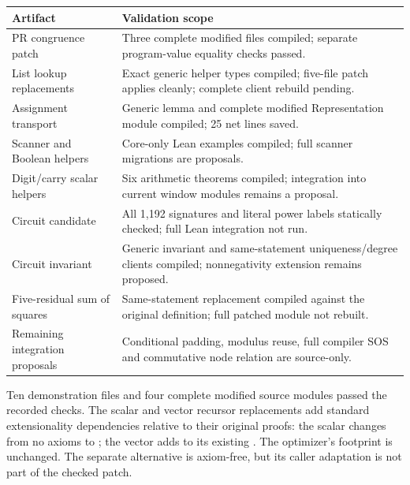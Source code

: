 \begin{center}
\small
\begin{tabularx}{\textwidth}{p{}Y}
\toprule
Artifact & Validation scope\\
\midrule
PR congruence patch & Three complete modified files compiled; separate program-value equality checks passed.\\
List lookup replacements & Exact generic helper types compiled; five-file patch applies cleanly; complete client rebuild pending.\\
Assignment transport & Generic lemma and complete modified Representation module compiled; 25 net lines saved.\\
Scanner and Boolean helpers & Core-only Lean examples compiled; full scanner migrations are proposals.\\
Digit/carry scalar helpers & Six arithmetic theorems compiled; integration into current window modules remains a proposal.\\
Circuit candidate & All 1,192 signatures and literal power labels statically checked; full Lean integration not run.\\
Circuit invariant & Generic invariant and same-statement uniqueness/degree clients compiled; nonnegativity extension remains proposed.\\
Five-residual sum of squares & Same-statement replacement compiled against the original definition; full patched module not rebuilt.\\
Remaining integration proposals & Conditional padding, modulus reuse, full compiler SOS and commutative node relation are source-only.\\
\bottomrule
\end{tabularx}
\end{center}

Ten demonstration files and four complete modified source modules passed the recorded checks. The scalar and vector recursor replacements add standard extensionality dependencies relative to their original proofs: the scalar changes from no axioms to ; the vector adds  to its existing . The optimizer's footprint is unchanged. The separate  alternative is axiom-free, but its caller adaptation is not part of the checked patch.
